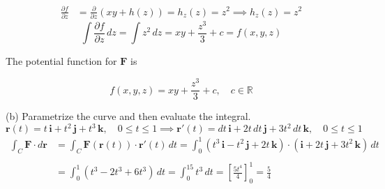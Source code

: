 \documentclass{article}
\begin{document}
\begin{align*}\frac{\partial f}{\partial z}&=\frac{\partial}{\partial z}\left(xy+h(z)\right)=h_z(z)=z^2\implies h_z(z)=z^2\end{align*}
\[\int\frac{\partial f}{\partial z}\,dz=\int z^2\,dz=xy+\frac{z^3}3+c=f(x,y,z)\]

\hfill

\noindent The potential function for $\mathbf{F}$ is

\[\boxed{f(x,y,z)=xy+\frac{z^3}3+c,\quad c\in\mathbb{R}}\]

\hfill

\noindent (b) Parametrize the curve and then evaluate the integral.
\[\mathbf{r}(t)=t\,\mathbf{i}+t^2\,\mathbf{j}+t^3\,\mathbf{k},\quad0\leq t\leq1\implies\mathbf{r}'(t)=dt\,\mathbf{i}+2t\,dt\,\mathbf{j}+3t^2\,dt\,\mathbf{k},\quad0\leq t\leq1\]
\begin{align*}\int_C\mathbf{F}\cdot d\mathbf{r}&=\int_C\mathbf{F}(\mathbf{r}(t))\cdot\mathbf{r}'(t)\,dt=\int_0^1\left(t^3\,\mathbf{i}-t^2\,\mathbf{j}+2t\,\mathbf{k}\right)\cdot(\mathbf{i}+2t\,\mathbf{j}+3t^2\,\mathbf{k})\,dt\\\\&=\int_0^1\left(t^3-2t^3+6t^3\right)\,dt=\int_0^15t^3\,dt=\left[\frac{5t^4}4\right]_0^1=\boxed{\frac54}\end{align*}
\end{document}
